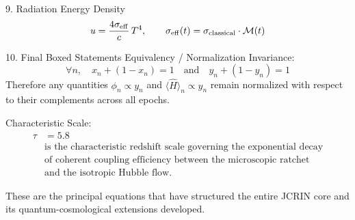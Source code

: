 9. Radiation Energy Density
\[
u = \frac{4\sigma_{\rm eff}}{c}\, T^4, \qquad \sigma_{\rm eff}(t) = \sigma_{\rm classical} \cdot \mathcal{M}(t)
\]

10. Final Boxed Statements
Equivalency / Normalization Invariance:
\[
\forall n,\quad x_n + (1-x_n)=1 \quad\text{and}\quad y_n + (1-y_n)=1
\]
Therefore any quantities \(\phi_n \propto y_n\) and \(\langle\hat{H}\rangle_n \propto y_n\) remain normalized with respect to their complements across all epochs.

Characteristic Scale:
\[
\boxed{
\begin{aligned}
\tau &= 5.8 \\
&\text{is the characteristic redshift scale governing the exponential decay} \\
&\text{of coherent coupling efficiency between the microscopic ratchet} \\
&\text{and the isotropic Hubble flow.}
\end{aligned}
}
\]

These are the principal equations that have structured the entire JCRIN core and its quantum-cosmological extensions developed.
